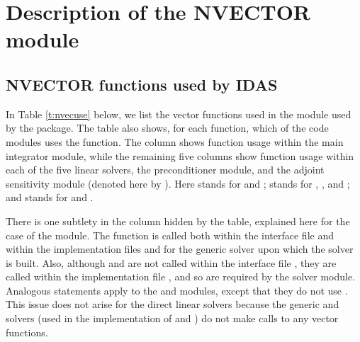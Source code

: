 \chapter{Description of the NVECTOR module}\label{s:nvector}



\section{NVECTOR functions used by IDAS}

In Table \ref{t:nvecuse} below, we list the vector functions used in the 
{\nvector} module used by the {\idas} package.
The table also shows, for each function, which of the code modules uses
the function. The {\idas} column shows function usage within the main
integrator module, while the remaining five columns show function usage
within each of the five {\idas} linear solvers, the {\idabbdpre}
preconditioner module, and the {\idas} adjoint sensitivity module
(denoted here by {\idaa}).
Here {\idadls} stands for {\idadense} and {\idaband}; {\idaspils} stands
for {\idaspgmr}, {\idaspbcg}, and {\idasptfqmr}; and {\idasls}
stands for {\idaklu} and {\idasuperlumt}.

There is one subtlety in the {\idaspils} column hidden by the table, explained
here for the case of the {\idaspgmr} module. 
The  function is called both within the interface file
 and within the implementation
files  and  for the generic
{\spgmr} solver upon which the {\idaspgmr} solver is built.  Also, although
 and  are not called within the interface file
, they are called within the implementation file
, and so are required by the {\idaspgmr} solver module.
Analogous statements apply to the {\idaspbcg} and {\idasptfqmr} modules,
except that they do not use .
This issue does not arise for the direct {\idas} linear solvers because
the generic {\dense} and {\band} solvers (used in the implementation of
{\idadense} and {\idaband}) do not make calls to any vector functions.


